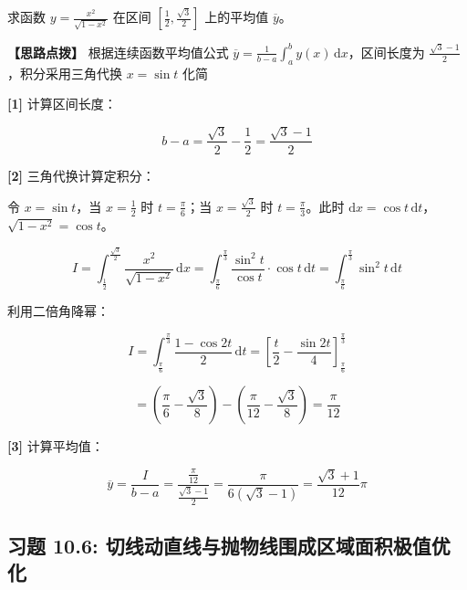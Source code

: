 \documentclass[11pt,a4paper,UTF8]{ctexart}
\begin{document}
求函数 $y = \frac{x^2}{\sqrt{1-x^2}}$ 在区间 $\left[\frac{1}{2}, \frac{\sqrt{3}}{2}\right]$ 上的平均值 $\overline{y}$。

\textbf{\color{DeepPurple}【思路点拨】} 根据连续函数平均值公式 $\overline{y} = \frac{1}{b-a}\int_a^b y(x)\,\mathrm{d}x$，区间长度为 $\frac{\sqrt{3}-1}{2}$，积分采用三角代换 $x = \sin t$ 化简


\begin{solbox}[分步推导与答题规范]
\textbf{[1]} 计算区间长度：


\begin{equation*}
b - a = \frac{\sqrt{3}}{2} - \frac{1}{2} = \frac{\sqrt{3}-1}{2}
\end{equation*}


\textbf{[2]} 三角代换计算定积分：

令 $x = \sin t$，当 $x = \frac{1}{2}$ 时 $t = \frac{\pi}{6}$；当 $x = \frac{\sqrt{3}}{2}$ 时 $t = \frac{\pi}{3}$。此时 $\mathrm{d}x = \cos t\,\mathrm{d}t$，$\sqrt{1-x^2} = \cos t$。


\begin{equation*}
I = \int_{\frac{1}{2}}^{\frac{\sqrt{3}}{2}} \frac{x^2}{\sqrt{1-x^2}}\,\mathrm{d}x = \int_{\frac{\pi}{6}}^{\frac{\pi}{3}} \frac{\sin^2 t}{\cos t} \cdot \cos t\,\mathrm{d}t = \int_{\frac{\pi}{6}}^{\frac{\pi}{3}} \sin^2 t\,\mathrm{d}t
\end{equation*}


利用二倍角降幂：


\begin{equation*}
I = \int_{\frac{\pi}{6}}^{\frac{\pi}{3}} \frac{1 - \cos 2t}{2}\,\mathrm{d}t = \left[\frac{t}{2} - \frac{\sin 2t}{4}\right]_{\frac{\pi}{6}}^{\frac{\pi}{3}}
\end{equation*}



\begin{equation*}
= \left(\frac{\pi}{6} - \frac{\sqrt{3}}{8}\right) - \left(\frac{\pi}{12} - \frac{\sqrt{3}}{8}\right) = \frac{\pi}{12}
\end{equation*}


\textbf{[3]} 计算平均值：


\begin{equation*}
\overline{y} = \frac{I}{b-a} = \frac{\frac{\pi}{12}}{\frac{\sqrt{3}-1}{2}} = \frac{\pi}{6(\sqrt{3}-1)} = \frac{\sqrt{3}+1}{12}\pi
\end{equation*}

\end{solbox}


\subsection{习题 10.6: 切线动直线与抛物线围成区域面积极值优化}
\end{document}
